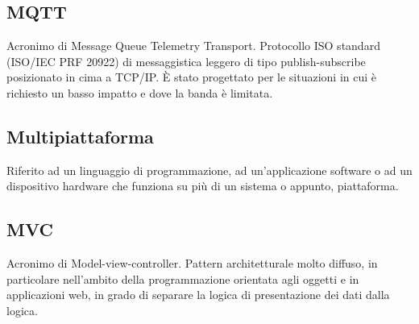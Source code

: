 \subsection*{MQTT}
Acronimo di Message Queue Telemetry Transport. Protocollo ISO standard (ISO/IEC PRF 20922) di messaggistica leggero di tipo publish-subscribe posizionato in cima a TCP/IP. È stato progettato per le situazioni in cui è richiesto un basso impatto e dove la banda è limitata. 

\subsection*{Multipiattaforma}
Riferito ad un linguaggio di programmazione, ad un'applicazione software o ad un dispositivo hardware che funziona su più di un sistema o appunto, piattaforma.

\subsection*{MVC}
Acronimo di Model-view-controller. Pattern architetturale molto diffuso, in particolare nell'ambito della programmazione orientata agli oggetti e in applicazioni web, in grado di separare la logica di presentazione dei dati dalla logica.